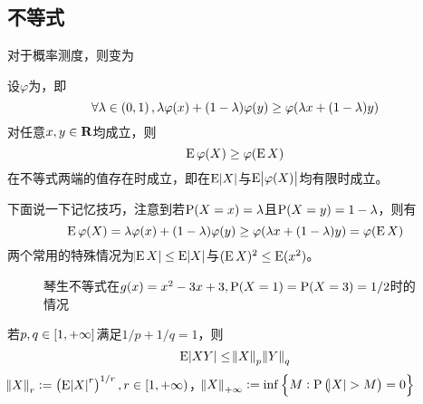\documentclass[../main.tex]{subfiles}
\begin{document}
\subsection{不等式}
对于概率测度，则变为
\begin{theorem}
	\label{thm:1.6.2}
	设\(\varphi\)为，即
	\[\forall\lambda\in\intoo{0,1},\lambda\varphi(x)+(1-\lambda)\varphi(y)\geq\varphi(\lambda x+(1-\lambda)y)\]
	对任意\(x,y\in\mathbf{R}\)均成立，则
	\[\operatorname{E}\varphi(X)\geq\varphi(\operatorname{E} X)\]
	在不等式两端的值存在时成立，即在\(\E\envert{X}\)与\(\E\envert{\varphi(X)}\)均有限时成立。
\end{theorem}
下面说一下记忆技巧，注意到若\(\operatorname{\mathrm{P}}(X=x)=\lambda\)且\(\operatorname{\mathrm{P}}(X=y)=1-\lambda\)，则有
\[\operatorname{E}\varphi(X)=\lambda\varphi(x)+(1-\lambda)\varphi(y)\geq\varphi(\lambda x+(1-\lambda)y)=\varphi(\operatorname{E} X)\]
两个常用的特殊情况为\(\envert{\E X}\leq\E\envert{X}\)与\((\operatorname{E} X)^2\leq\operatorname{E}(x^2)\)。
\begin{figure}
	\centering
	\caption{琴生不等式在\(g(x)=x^2-3x+3, \operatorname{\mathrm{P}}(X=1)=\operatorname{\mathrm{P}}(X=3)=1/2\)时的情况}
\end{figure}

\begin{theorem}
	\label{thm:1.6.3}
	若\(p,q\in\intcc{1,+\infty}\)满足\(1/p+1/q=1\)，则
	\[\E\envert{XY}\leq\enVert{X}_p\enVert{Y}_q\]
	\(\enVert{X}_r:=\del{\E \envert{X}^r}^{1/r}, r\in\intco{1,+\infty}\)，\(\enVert{X}_{+\infty}:=\inf\cbr{M:\probP\del{\envert{X}>M}=0}\)
\end{theorem}
\end{document}
